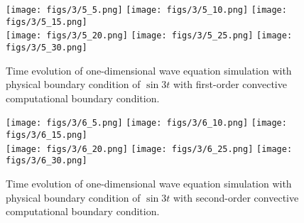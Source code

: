 \documentclass[11pt]{article}
\begin{document}
\begin{enumerate}
        \begin{figure}[ht]
        \begin{center}
        \texttt{[image: figs/3/5\_5.png]}
        \texttt{[image: figs/3/5\_10.png]}
        \texttt{[image: figs/3/5\_15.png]}\\
        \texttt{[image: figs/3/5\_20.png]}
        \texttt{[image: figs/3/5\_25.png]}
        \texttt{[image: figs/3/5\_30.png]}\\
        \end{center}
        \caption{Time evolution of one-dimensional wave equation simulation with physical boundary condition
                of $\sin 3 t$ with first-order convective computational boundary condition.}
        \label{fig2_5}
        \end{figure}

      \begin{figure}[ht]
        \begin{center}
        \texttt{[image: figs/3/6\_5.png]}
        \texttt{[image: figs/3/6\_10.png]}
        \texttt{[image: figs/3/6\_15.png]}\\
        \texttt{[image: figs/3/6\_20.png]}
        \texttt{[image: figs/3/6\_25.png]}
        \texttt{[image: figs/3/6\_30.png]}\\
        \end{center}
        \caption{Time evolution of one-dimensional wave equation simulation with physical boundary condition
                of $\sin 3 t$ with second-order convective computational boundary condition.}
        \label{fig2_5}
        \end{figure}



\end{enumerate}
\end{document}
